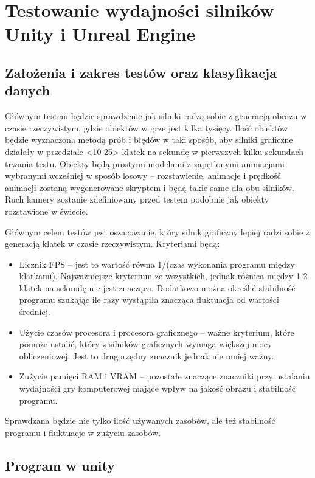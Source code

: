 \documentclass[12pt,twoside]{article}
\begin{document}
\clearpage	
\section{Testowanie wydajności silników Unity i Unreal Engine}

\subsection{Założenia i zakres  testów oraz klasyfikacja danych}
Głównym testem będzie sprawdzenie jak silniki radzą sobie z generacją obrazu w
czasie rzeczywistym, gdzie obiektów w grze jest kilka tysięcy. Ilość obiektów
będzie wyznaczona metodą prób i błędów w taki sposób, aby silniki graficzne
działały w przedziale <10-25> klatek na sekundę w pierwszych kilku sekundach
trwania testu. Obiekty będą prostymi modelami z zapętlonymi animacjami wybranymi
wcześniej w sposób losowy – rozstawienie, animacje i prędkość animacji zostaną
wygenerowane skryptem i będą takie same dla obu silników. Ruch kamery zostanie
zdefiniowany przed testem podobnie jak obiekty rozstawione w świecie. 

Głównym celem testów jest oszacowanie, który silnik graficzny lepiej radzi sobie
z generacją klatek w czasie rzeczywistym. Kryteriami będą:
\begin{itemize}
\item Licznik FPS – jest to wartość równa 1/(czas wykonania programu między
klatkami). Najważniejsze kryterium ze wszystkich, jednak różnica między 1-2
klatek na sekundę nie jest znacząca. Dodatkowo można określić stabilność
programu szukając ile razy wystąpiła znacząca fluktuacja od wartości średniej. 
\item Użycie czasów procesora i procesora graficznego – ważne kryterium, które
pomoże ustalić, który z silników graficznych wymaga większej mocy obliczeniowej.
Jest to drugorzędny znacznik jednak nie mniej ważny. 
\item Zużycie pamięci RAM i VRAM – pozostałe znaczące znaczniki przy ustalaniu
wydajności gry komputerowej mające wpływ na jakość obrazu i stabilność programu. 
\end{itemize}
Sprawdzana będzie nie tylko ilość używanych zasobów, ale też stabilność programu
i fluktuacje w zużyciu zasobów. 




\subsection{Program w unity}
\end{document}
